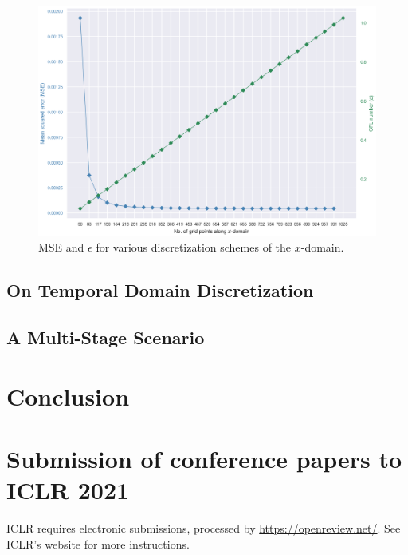 \documentclass{article}
\begin{document}
\begin{figure}[t!]
   \centering
   \includegraphics[scale=0.75]{on spatial domain discretization - mse and cfl.png}
   \caption{MSE and $\epsilon$ for various discretization schemes of the $x$-domain.}
	\label{fig: On Spatial Domain Discretization results: MSE and CFL}
\end{figure}

\lipsum[54]

\subsection{On Temporal Domain Discretization}
\label{subsec: On Temporal Domain Discretization}

\lipsum[92]

\subsection{A Multi-Stage Scenario}
\label{subsec: A Multi-Stage Scenario}

\lipsum[84]

\section{Conclusion}
\label{sec: Conclusion}

\lipsum[20]

\section*{Submission of conference papers to ICLR 2021}

ICLR requires electronic submissions, processed by
\url{https://openreview.net/}. See ICLR's website for more instructions.
\end{document}

